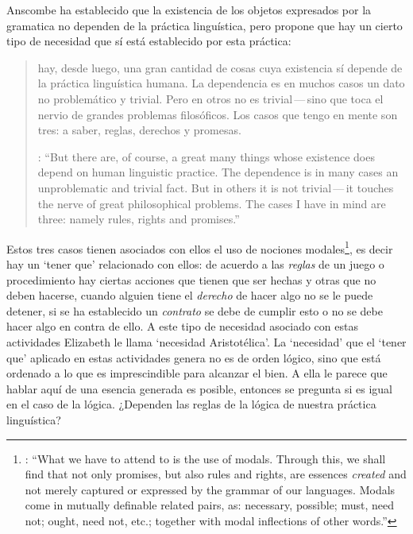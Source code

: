Anscombe ha establecido que la existencia de los objetos expresados por la gramatica no dependen de la práctica linguística, pero propone que hay un cierto tipo de necesidad que sí está establecido por esta práctica: \blockquote[{\cite[118]{anscombe1981parmenides:qli}}: \enquote{But there are, of course, a great many things whose existence does depend on human linguistic practice. The dependence is in many cases an unproblematic and trivial fact. But in others it is not trivial\,---\,it touches the nerve of great philosophical problems. The cases I have in mind are three: namely rules, rights and promises.}]{hay, desde luego, una gran cantidad de cosas cuya existencia sí depende de la práctica linguística humana. La dependencia es en muchos casos un dato no problemático y trivial. Pero en otros no es trivial\,---\,sino que toca el nervio de grandes problemas filosóficos. Los casos que tengo en mente son tres: a saber, reglas, derechos y promesas.} Estos tres casos tienen asociados con ellos el uso de nociones modales\footnote{\cite[Cf.~][100]{anscombe1981erp:rrp}: \enquote{What we have to attend to is the use of modals. Through this, we shall find that not only promises, but also rules and rights, are essences \emph{created} and not merely captured or expressed by the grammar of our languages. Modals come in mutually definable related pairs, as: necessary, possible; must, need not; ought, need not, etc.; together with modal inflections of other words.}}, es decir hay un `tener que' relacionado con ellos: de acuerdo a las \emph{reglas} de un juego o procedimiento hay ciertas acciones que tienen que ser hechas y otras que no deben hacerse, cuando alguien tiene el \emph{derecho} de hacer algo no se le puede detener, si se ha establecido un \emph{contrato} se debe de cumplir esto o no se debe hacer algo en contra de ello. A este tipo de necesidad asociado con estas actividades Elizabeth le llama `necesidad Aristotélica'. La `necesidad' que el `tener que' aplicado en estas actividades genera no es de orden lógico, sino que está ordenado a lo que es imprescindible para alcanzar el bien. A ella le parece que hablar aquí de una esencia generada es posible, entonces se pregunta si es igual en el caso de la lógica. ¿Dependen las reglas de la lógica de nuestra práctica linguística?

